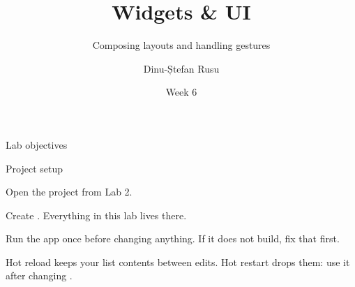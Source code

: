 \documentclass[10pt,aspectratio=169,t]{beamer}
\title{Widgets \& UI}
\subtitle{Composing layouts and handling gestures}
\author{Dinu-Ștefan Rusu}
\date{Week 6}
\begin{document}
\titleframe

\begin{frame}[eyebrow=Today]{Lab objectives}
  \vskip 2mm
  \begin{grid}[2]
  \end{grid}
  \vskip 6mm
\end{frame}

\begin{frame}[fragile,eyebrow=Setup]{Project setup}
  \begin{steps}
    \item Open the project from Lab 2.
    \item Create . Everything in this lab lives there.
    \item Run the app once before changing anything. If it does not build, fix that first.
  \end{steps}
  \begin{hint}
    Hot reload keeps your list contents between edits. Hot restart drops them: use it after changing .
  \end{hint}
\end{frame}
\end{document}
